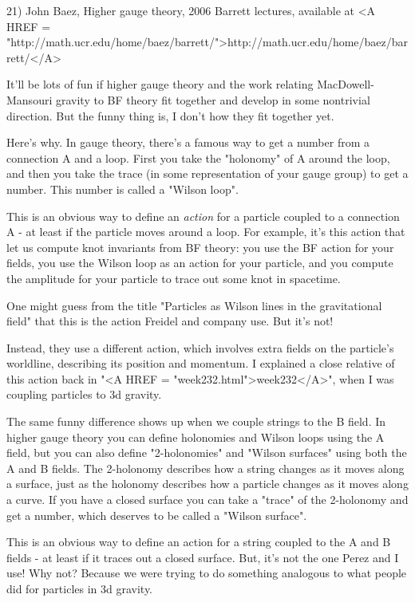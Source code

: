 21) John Baez, Higher gauge theory, 2006 Barrett lectures, available
at <A HREF =
"http://math.ucr.edu/home/baez/barrett/">http://math.ucr.edu/home/baez/barrett/</A>

It'll be lots of fun if higher gauge theory and the work
relating MacDowell-Mansouri gravity to BF theory fit together 
and develop in some nontrivial direction.  But the funny thing
is, I don't how they fit together yet.  

Here's why.  In gauge theory, there's a famous way to get a number
from a connection A and a loop.  First you take the
"holonomy" of A around the loop, and then you take the trace
(in some representation of your gauge group) to get a number.  This
number is called a "Wilson loop".

This is an obvious way to define an \emph{action} for a particle coupled 
to a connection A - at least if the particle moves around a loop.
For example, it's this action that let us compute knot invariants 
from BF theory: you use the BF action for your fields, you use the
Wilson loop as an action for your particle, and you compute the 
amplitude for your particle to trace out some knot in spacetime.

One might guess from the title "Particles as Wilson lines in the 
gravitational field" that this is the action Freidel and company use.  
But it's not!

Instead, they use a different action, which involves extra fields on
the particle's worldline, describing its position and momentum.  I
explained a close relative of this action back in "<A HREF =
"week232.html">week232</A>", when I was coupling particles to 3d
gravity.

The same funny difference shows up when we couple strings to the B
field.  In higher gauge theory you can define holonomies and Wilson
loops using the A field, but you can also define
"2-holonomies" and "Wilson surfaces" using both
the A and B fields.  The 2-holonomy describes how a string changes as
it moves along a surface, just as the holonomy describes how a
particle changes as it moves along a curve.  If you have a closed
surface you can take a "trace" of the 2-holonomy and get a
number, which deserves to be called a "Wilson surface".

This is an obvious way to define an action for a string coupled to 
the A and B fields - at least if it traces out a closed surface.  
But, it's not the one Perez and I use!  Why not?  Because we were
trying to do something analogous to what people did for particles
in 3d gravity.

